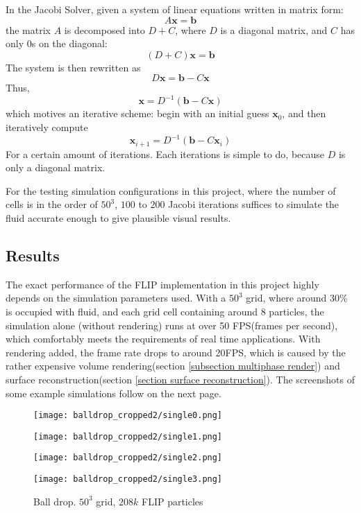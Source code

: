 In the Jacobi Solver, given a system of linear equations written in matrix form:
$$
A\textbf{x}=\textbf{b}
$$
the matrix $A$ is decomposed into $D+C$, where $D$ is a diagonal matrix, and $C$ has only $0$s on the diagonal:
$$
(D+C)\textbf{x}=\textbf{b}
$$
The system is then rewritten as 
$$
D\textbf{x}=\textbf{b} - C\textbf{x}
$$
Thus,
$$
\textbf{x}=D^{-1}(\textbf{b} - C\textbf{x})
$$
which motives an iterative scheme: begin with an initial guess $\textbf{x}_0$, and then iteratively compute
$$
\textbf{x}_{i+1} = D^{-1}(\textbf{b} - C\textbf{x}_{i})
$$
For a certain amount of iterations. Each iterations is simple to do, because $D$ is only a diagonal matrix. 

For the testing simulation configurations in this project, where the number of cells is in the order of $50^3$, $100$ to $200$ Jacobi iterations suffices to simulate the fluid accurate enough to give plausible visual results. 

\subsection{Results}
The exact performance of the FLIP implementation in this project highly depends on the simulation parameters used. With a $50^3$ grid, where around 30\% is occupied with fluid, and each grid cell containing around 8 particles, the simulation alone (without rendering) runs at over 50 FPS(frames per second), which comfortably meets the requirements of real time applications. With rendering added, the frame rate drops to around 20FPS, which is caused by the rather expensive volume rendering(section \ref{subsection multiphase render}) and surface reconstruction(section \ref{section surface reconstruction}). The screenshots of some example simulations follow on the next page.
\newpage

\begin{figure}[H]
    \centering
    
    \begin{minipage}[t]{.24\linewidth}
        \centering
        \vspace{0pt}
        \texttt{[image: balldrop\_cropped2/single0.png]}
    \end{minipage}
    \begin{minipage}[t]{.24\linewidth}
        \centering
        \vspace{0pt}
        \texttt{[image: balldrop\_cropped2/single1.png]}
    \end{minipage}
    \begin{minipage}[t]{.24\linewidth}
        \centering
        \vspace{0pt}
        \texttt{[image: balldrop\_cropped2/single2.png]}
    \end{minipage}
    \begin{minipage}[t]{.24\linewidth}
        \centering
        \vspace{0pt}
        \texttt{[image: balldrop\_cropped2/single3.png]}
    \end{minipage}

    \caption{Ball drop. $50^3$ grid, $208k$ FLIP particles}
    \label{figure ball drop single}
\end{figure}


